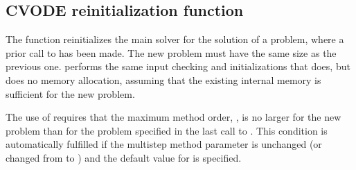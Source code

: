 \subsection{CVODE reinitialization function}\label{sss:cvreinit}

The function  reinitializes the main {\cvode} solver for
the solution of a problem, where a prior call to  has
been made. The new problem must have the same size as the previous one.
 performs the same input checking and initializations 
that  does, but does no memory allocation, assuming that the 
existing internal memory is sufficient for the new problem.             
                                                                 
The use of  requires that the maximum method order,    
, is no larger for the new problem than for the problem  
specified in the last call to .  This condition is  
automatically fulfilled if the multistep method parameter   
is unchanged (or changed from  to ) and the default    
value for  is specified.

